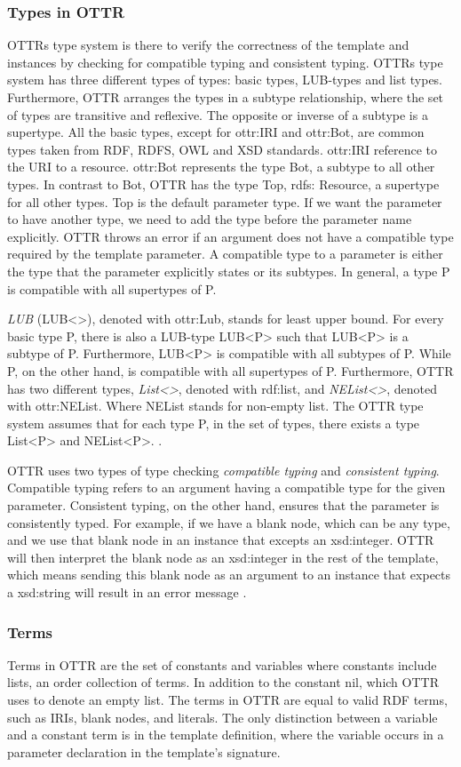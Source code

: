 \subsubsection{Types in OTTR}
\label{ottr types} 
OTTRs type system is there to verify the correctness of the template and instances by checking for compatible typing and consistent typing. OTTRs type system has three different types of types: basic types, LUB-types and list types. Furthermore, OTTR arranges the types in a subtype relationship, where the set of types are transitive and reflexive. The opposite or inverse of a subtype is a supertype. All the basic types, except for ottr:IRI and ottr:Bot, are common types taken from RDF, RDFS, OWL and XSD standards. ottr:IRI reference to the URI to a resource. ottr:Bot represents the type Bot, a subtype to all other types. In contrast to Bot, OTTR has the type Top, rdfs: Resource, a supertype for all other types.  Top is the default parameter type. If we want the parameter to have another type, we need to add the type before the parameter name explicitly. OTTR throws an error if an argument does not have a compatible type required by the template parameter. A compatible type to a parameter is either the type that the parameter explicitly states or its subtypes. In general, a type P is compatible with all supertypes of P.

\para
\emph{LUB} (LUB<>), denoted with ottr:Lub, stands for least upper bound. For every basic type P, there is also a LUB-type LUB<P> such that LUB<P> is a subtype of P. Furthermore, LUB<P> is compatible with all subtypes of P. While P, on the other hand, is compatible with all supertypes of P. Furthermore, OTTR has two different types, \emph{List<>}, denoted with rdf:list, and \emph{NEList<>}, denoted with ottr:NEList. Where NEList stands for non-empty list. The OTTR type system assumes that for each type P, in the set of types, there exists a type List<P> and NEList<P>.  \autocite[5]{SLKK_OTTR_2021}.

\para
OTTR uses two types of type checking \emph{compatible typing} and \emph{consistent typing}. Compatible typing refers to an argument having a compatible type for the given parameter. Consistent typing, on the other hand, ensures that the parameter is consistently typed. For example, if we have a blank node, which can be any type, and we use that blank node in an instance that excepts an xsd:integer. OTTR will then interpret the blank node as an xsd:integer in the rest of the template, which means sending this blank node as an argument to an instance that expects a xsd:string will result in an error message \autocite[5-6]{SLKK_OTTR_2021}. 

\subsubsection{Terms}
Terms in OTTR are the set of constants and variables where constants include lists, an order collection of terms. In addition to the constant nil, which OTTR uses to denote an empty list. The terms in OTTR are equal to valid RDF terms, such as IRIs, blank nodes, and literals. The only distinction between a variable and a constant term is in the template definition, where the variable occurs in a parameter declaration in the template's signature.\autocite{OTTR_mOTTR}
